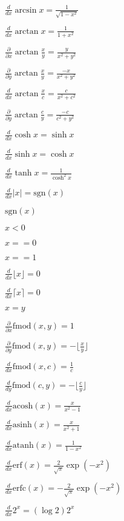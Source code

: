 \documentclass{article}
\begin{document}
$\frac{d}{dx} \arcsin x = \frac{1}{\sqrt{1 - x^2}}$
\pagebreak

$\frac{d}{dx} \arctan x = \frac{1}{1 + x^2}$
\pagebreak

$ \frac{\partial}{\partial x} \arctan \frac{x}{y} = \frac{y}{x^2 + y^2}$
\pagebreak

$ \frac{\partial}{\partial y} \arctan \frac{x}{y} = \frac{-x}{x^2 + y^2}$
\pagebreak

$ \frac{d}{d x} \arctan \frac{x}{c} = \frac{c}{x^2 + c^2}$
\pagebreak

$ \frac{\partial}{\partial y} \arctan \frac{c}{y} = \frac{-c}{c^2 + y^2}$
\pagebreak

$\frac{d}{dx} \cosh x = \sinh x$
\pagebreak

$\frac{d}{dx} \sinh x = \cosh x$
\pagebreak

$\frac{d}{dx} \tanh x = \frac{1}{\cosh^2 x}$
\pagebreak

$\frac{d}{dx}|x| = \mbox{sgn}(x)$
\pagebreak

$\mbox{sgn}(x)$
\pagebreak

$x < 0$
\pagebreak

$x == 0$
\pagebreak

$x == 1$
\pagebreak

$\frac{d}{dx} {\lfloor x \rfloor} = 0$
\pagebreak

$\frac{d}{dx} {\lceil x \rceil} = 0$
\pagebreak

$x = y$
\pagebreak

$\frac{\partial}{\partial x} \mbox{fmod}(x,y) = 1$
\pagebreak

$\frac{\partial}{\partial y} \mbox{fmod}(x,y) = -\lfloor \frac{x}{y} \rfloor$
\pagebreak

$\frac{d}{d x} \mbox{fmod}(x,c) = \frac{1}{c}$
\pagebreak

$\frac{d}{d y} \mbox{fmod}(c,y) = -\lfloor \frac{c}{y} \rfloor$
\pagebreak

$\frac{d}{dx} \mbox{acosh}(x) = \frac{x}{x^2 - 1}$
\pagebreak

$\frac{d}{dx} \mbox{asinh}(x) = \frac{x}{x^2 + 1}$
\pagebreak

$\frac{d}{dx} \mbox{atanh}(x) = \frac{1}{1 - x^2}$
\pagebreak

$\frac{d}{dx} \mbox{erf}(x) = \frac{2}{\sqrt{\pi}} \exp(-x^2)$
\pagebreak

$\frac{d}{dx} \mbox{erfc}(x) = - \frac{2}{\sqrt{\pi}} \exp(-x^2)$
\pagebreak

$\frac{d}{dx} 2^x = (\log 2) 2^x$
\pagebreak
\end{document}
